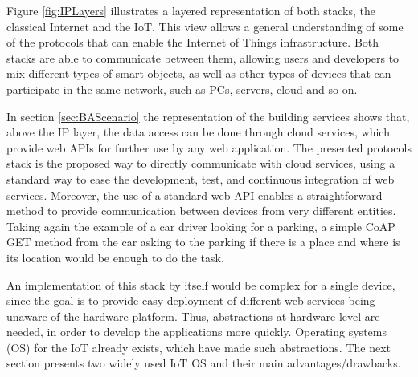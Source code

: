 Figure \ref{fig:IPLayers} illustrates a layered representation of both stacks, the classical Internet and the IoT.
This view allows a general understanding of some of the protocols that can enable the Internet of Things infrastructure.
Both stacks are able to communicate between them, allowing users and developers to mix different types of smart objects, as well as other types of devices that can participate in the same network, such as PCs, servers, cloud and so on.

In section \ref{sec:BAScenario} the representation of the building services shows that, above the IP layer, the data access can be done through cloud services, which provide web APIs for further use by any web application.
The presented protocols stack is the proposed way to directly communicate with cloud services, using a standard way to ease the development, test, and continuous integration of web services.
Moreover, the use of a standard web API enables a straightforward method to provide communication between devices from very different entities.
Taking again the example of a car driver looking for a parking, a simple CoAP GET method from the car asking to the parking if there is a place and where is its location would be enough to do the task.

An implementation of this stack by itself would be complex for a single device, since the goal is to provide easy deployment of different web services being unaware of the hardware platform.
Thus, abstractions at hardware level are needed, in order to develop the applications more quickly.
Operating systems (OS) for the IoT already exists, which have made such abstractions.
The next section presents two widely used IoT OS and their main advantages/drawbacks.



